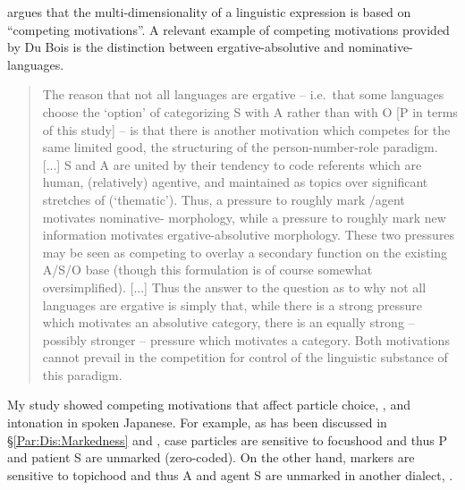  argues that the multi-dimensionality of a linguistic expression is based on ``competing motivations''.
A relevant example of competing motivations provided by Du Bois is the distinction between ergative-absolutive and nominative- languages.
%
\begin{quote}
The reason that not all languages are ergative -- i.e.~that some languages choose the `option' of categorizing S with A rather than with O [P in terms of this study] -- 
is that there is another motivation which competes for the same limited good,
the structuring of the person-number-role paradigm. [...]
S and A are united by their tendency to code referents which are human,
(relatively) agentive, and maintained as topics over significant stretches of  (`thematic').
Thus, a  pressure to roughly mark /agent motivates nominative- morphology,
while a  pressure to roughly mark new information motivates ergative-absolutive morphology.
These two pressures may be seen as competing to overlay a secondary function on the existing A/S/O base (though this formulation is of course somewhat oversimplified). [...]
Thus the answer to the question as to why not all languages are ergative is simply that,
while there is a strong  pressure which motivates an absolutive category, there is an equally strong -- possibly stronger --
 pressure which motivates a  category.
Both motivations cannot prevail in the competition for control of the linguistic substance of this paradigm.
\cite[354--355]{dubois85}
\end{quote}
%
My study showed competing motivations that affect
particle choice, , and intonation in spoken Japanese.
For example,
as has been discussed in \S \ref{Par:Dis:Markedness} and ,
case particles are sensitive to focushood and thus
P and patient S are unmarked (zero-coded).
On the other hand,  markers are sensitive to topichood and thus
A and agent S are unmarked in another dialect, .

